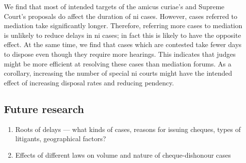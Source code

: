 We find that most of intended targets of the amicus curiae's and Supreme Court's proposals do affect the duration of \gls{ni} cases. However, cases referred to mediation take significantly longer. Therefore, referring more cases to mediation is unlikely to reduce delays in \gls{ni} cases; in fact this is likely to have the opposite effect. At the same time, we find that cases which are contested take fewer days to dispose even though they require more hearings. This indicates that judges might be more efficient at resolving these cases than mediation forums. As a corollary, increasing the number of special \gls{ni} courts might have the intended effect of increasing disposal rates and reducing pendency.



\subsection{Future research}
\label{sec:future-research}

\begin{enumerate}
\item Roots of delays --- what kinds of cases, reasons for issuing cheques, types of litigants, geographical factors?
\item Effects of different laws on volume and nature of cheque-dishonour cases
\end{enumerate}


